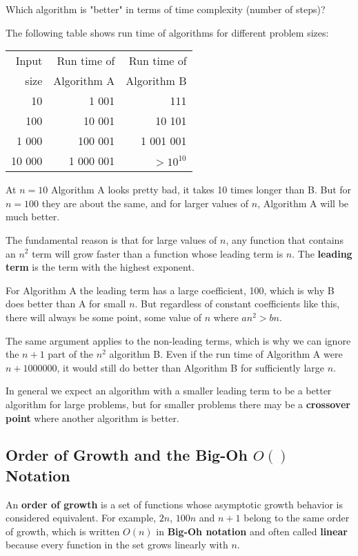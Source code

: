 \documentclass[11pt]{article}
\begin{document}
Which algorithm is "better" in terms of time complexity (number of steps)?

The following table shows run time of algorithms for different problem sizes:

\begin{center}
\begin{tabular}{rrr}
Input & Run time of & Run time of\\
size & Algorithm A & Algorithm B\\
\hline
10 & 1 001 & 111\\
100 & 10 001 & 10 101\\
1 000 & 100 001 & 1 001 001\\
10 000 & 1 000 001 & $> 10^{10}$\\
\end{tabular}
\end{center}

At $n = 10$ Algorithm A looks pretty bad, it takes 10 times longer
than B.  But for $n = 100$ they are about the same, and for larger
values of $n$, Algorithm A will be much better.  

The fundamental reason is that for large values of $n$, any function
that contains an $n^2$ term will grow faster than a function whose
leading term is $n$.  The \textbf{leading term} is the term with the
highest exponent.

For Algorithm A the leading term has a large coefficient, 100, which
is why B does better than A for small $n$. But regardless of constant
coefficients like this, there will always be some point, some value of
$n$ where $a n^2 > b n$.

The same argument applies to the non-leading terms, which is why we
can ignore the $n + 1$ part of the $n^2$ algorithm B.  Even if the
run time of Algorithm A were $n + 1000000$, it would still do better
than Algorithm B for sufficiently large $n$.

In general we expect an algorithm with a smaller leading term to be
a better algorithm for large problems, but for smaller problems there
may be a \textbf{crossover point} where another algorithm is better.
\subsection{Order of Growth and the Big-Oh $O()$ Notation}
\label{sec-1-2}

An \textbf{order of growth} is a set of functions whose asymptotic growth behavior
is considered equivalent.  For example, $2n$, $100n$ and $n + 1$ belong to
the same order of growth, which is written $O(n)$ in \textbf{Big-Oh notation} and
often called \textbf{linear} because every function in the set grows linearly with
$n$.
\end{document}
